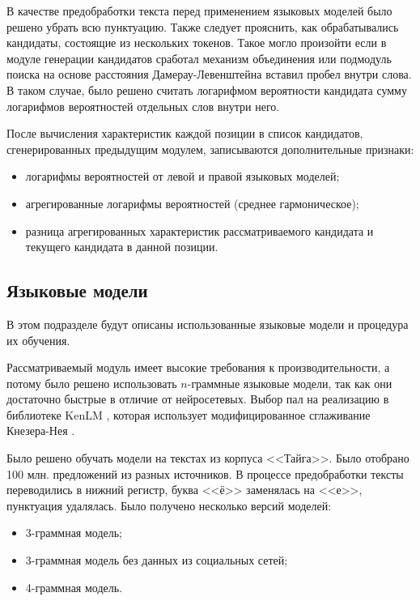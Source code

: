 В качестве предобработки текста перед применением языковых моделей было решено убрать всю пунктуацию. Также следует прояснить, как обрабатывались кандидаты, состоящие из нескольких токенов. Такое могло произойти если в модуле генерации кандидатов сработал механизм объединения или подмодуль поиска на основе расстояния Дамерау-Левенштейна вставил пробел внутри слова. В таком случае, было решено считать логарифмом вероятности кандидата сумму логарифмов вероятностей отдельных слов внутри него.

После вычисления характеристик каждой позиции в список кандидатов, сгенерированных предыдущим модулем, записываются дополнительные признаки:
\begin{itemize}
	\item логарифмы вероятностей от левой и правой языковых моделей;
	\item агрегированные логарифмы вероятностей (среднее гармоническое);
	\item разница агрегированных характеристик рассматриваемого кандидата и текущего кандидата в данной позиции.
\end{itemize}

\subsection{Языковые модели}

В этом подразделе будут описаны использованные языковые модели и процедура их обучения.

Рассматриваемый модуль имеет высокие требования к производительности, а потому было решено использовать $n$-граммные языковые модели, так как они достаточно быстрые в отличие от нейросетевых. Выбор пал на реализацию в библиотеке KenLM \cite{Heafield2011} \cite{Heafield2013}, которая использует модифицированное сглаживание Кнезера-Нея \cite{Chen1996}.

Было решено обучать модели на текстах из корпуса <<Тайга>>. Было отобрано 100 млн. предложений из разных источников. В процессе предобработки тексты переводились в нижний регистр, буква <<ё>> заменялась на <<е>>, пунктуация удалялась. Было получено несколько версий моделей:
\begin{itemize}
	\item 3-граммная модель;
	\item 3-граммная модель без данных из социальных сетей;
	\item 4-граммная модель.
\end{itemize}

